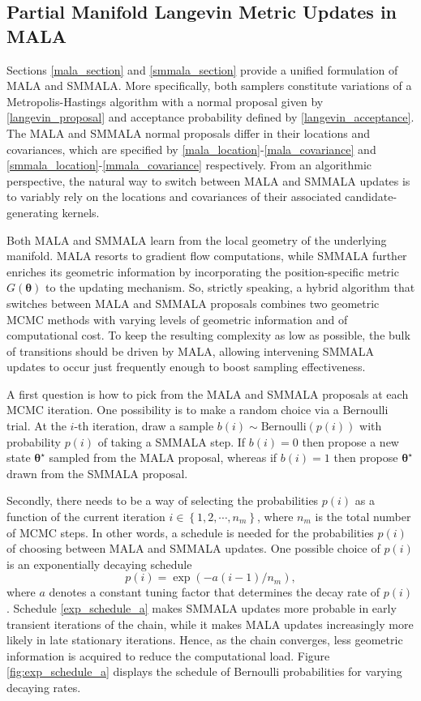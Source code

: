 \documentclass[twoside,11pt]{article}
\begin{document}
\subsection{Partial Manifold Langevin Metric Updates in MALA}

Sections \ref{mala_section} and \ref{smmala_section} provide a unified formulation of MALA and SMMALA. More specifically, 
both samplers constitute variations of a Metropolis-Hastings algorithm with a normal proposal given by 
\eqref{langevin_proposal} and acceptance probability defined by \eqref{langevin_acceptance}. The MALA and SMMALA normal 
proposals differ in their locations and covariances, which are specified by \eqref{mala_location}-\eqref{mala_covariance} 
and \eqref{smmala_location}-\eqref{mmala_covariance} respectively. From an algorithmic perspective, the natural way to 
switch between MALA and SMMALA updates is to variably rely on the locations and covariances of their associated 
candidate-generating kernels.

Both MALA and SMMALA learn from the local geometry of the underlying manifold. MALA resorts to gradient flow computations, 
while SMMALA further enriches its geometric information by incorporating the position-specific metric 
$G(\boldsymbol{\theta})$ to the updating mechanism. So, strictly speaking, a hybrid algorithm that switches between MALA and 
SMMALA proposals combines two geometric MCMC methods with varying levels of geometric information and of computational cost. 
To keep the resulting complexity as low as possible, the bulk of transitions should be driven by MALA, allowing intervening 
SMMALA updates to occur just frequently enough to boost sampling effectiveness.

A first question is how to pick from the MALA and SMMALA proposals at each MCMC iteration. One possibility is to make a
random choice via a Bernoulli trial. At the $i$-th iteration, draw a sample $b(i)\sim \mbox{Bernoulli}(p(i))$ with
probability $p(i)$ of taking a SMMALA step. If $b(i)=0$ then propose a new state $\boldsymbol{\theta}^{\star}$ sampled from
the MALA proposal, whereas if $b(i)=1$ then propose $\boldsymbol{\theta}^{\star}$ drawn from the SMMALA proposal.

Secondly, there needs to be a way of selecting the probabilities $p(i)$ as a function of the current iteration
$i\in\left\{1,2,\cdots,n_m\right\}$, where $n_m$ is the total number of MCMC steps. In other words, a schedule is needed for
the probabilities $p(i)$ of choosing between MALA and SMMALA updates. One possible choice of $p(i)$ is an exponentially 
decaying schedule
\begin{equation}
\label{exp_schedule_a}
p(i)=\exp{(-a(i-1)/n_m)},
\end{equation}
where $a$ denotes a constant tuning factor that determines the decay rate of $p(i)$.
Schedule \eqref{exp_schedule_a} makes SMMALA updates more probable in early transient iterations of the chain, while it 
makes MALA updates increasingly more likely in late stationary iterations. Hence, as the chain converges, less geometric 
information is acquired to reduce the computational load. Figure \ref{fig:exp_schedule_a} displays the schedule of Bernoulli 
probabilities for varying decaying rates.
\end{document}

